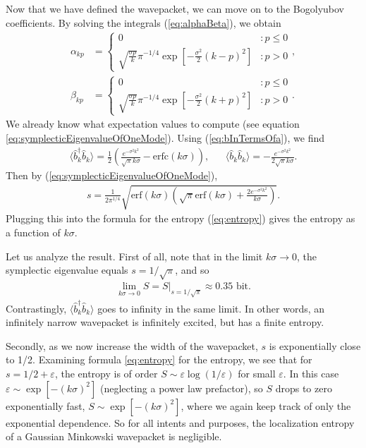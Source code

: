 \documentclass[11pt, a4paper]{article}
\newcommand{\be}{\beta}
\newcommand{\al}{\alpha}
\newcommand{\si}{{\sigma}}
\newcommand{\nodagger}{{\phantom{\dagger}}}
\begin{document}
Now that we have defined the wavepacket, we can move on to the Bogolyubov coefficients. By solving the integrals (\ref{eq:alphaBeta}), we obtain 
\begin{align*}
\al_{kp}&=\left\{\begin{array}{ll}0&:p\leq0\\\sqrt{\frac{\si p}{ k }}\pi^{-1/4}\exp[-\frac{\si^2}{2}(k-p)^2]&:p>0\end{array}\right.,
\\
\be_{kp}&=\left\{\begin{array}{ll}0&:p\leq0\\\sqrt{\frac{\si p}{ k }}\pi^{-1/4}\exp[-\frac{\si^2}{2}(k+p)^2]&:p>0\end{array}\right..
\end{align*}
We already know what expectation values to compute (see equation \ref{eq:symplecticEigenvalueOfOneMode}).
Using (\ref{eq:bInTermsOfa}), we find
\begin{align*}
\langle\hat b_k^\dagger \hat b^\nodagger_k \rangle =\frac{1}{2} \left(\frac{e^{-\sigma ^2 k^2 }}{\sqrt{\pi } k \sigma }-\text{erfc}(k \sigma )\right),&&
\langle\hat b_k \hat b_k\rangle =-\frac{e^{-\sigma ^2 k^2}}{2 \sqrt{\pi }k\si}.
\end{align*}
Then by (\ref{eq:symplecticEigenvalueOfOneMode}), 
\begin{align*}
s=\frac{1}{2\pi^{1/4}}\sqrt{\text{erf}(k\sigma) \left(\sqrt{\pi } \text{erf}(k\sigma)+\frac{2 e^{-\sigma^2k^2}}{k\sigma}\right)}.
\end{align*}
Plugging this into the formula for the entropy (\ref{eq:entropy}) gives the entropy as a function of $k\si$. 

Let us analyze the result. First of all, note that in the limit $k\si\to 0$, the symplectic eigenvalue equals $s=1/\sqrt{\pi}$, and so
\begin{align}
\label{eq:misteryS}
	\lim_{k\si\rightarrow 0} S=S|_{s=1/\sqrt{\pi}}\approx0.35\text{ bit}.
\end{align}
Contrastingly, $\langle\hat b_k^\dagger \hat b^\nodagger_k \rangle $ goes to infinity in the same limit. In other words, an infinitely narrow wavepacket is infinitely excited, but has a finite entropy. 

Secondly, as we now increase the width of the wavepacket, $s$ is exponentially close to 1/2. Examining formula \ref{eq:entropy} for the entropy, we see that for $s = 1/2 + \varepsilon$, the entropy is of order $S \sim \varepsilon \log(1/\varepsilon)$ for small $\varepsilon$. In this case $\varepsilon \sim \exp[-(k \sigma)^2]$ (neglecting a power law prefactor), so  $S$ drops to zero exponentially fast, $S \sim \exp[-(k \sigma)^2]$, where we again keep track of only the exponential dependence. So for all intents and purposes, the localization entropy of a Gaussian Minkowski wavepacket is negligible.
\end{document}
